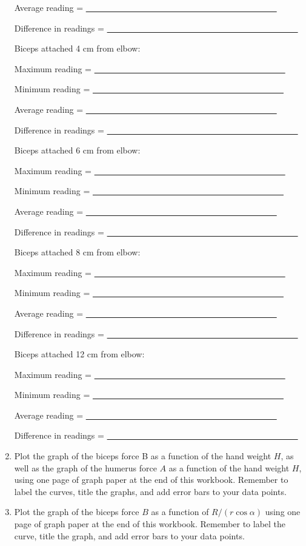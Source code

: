 \begin{enumerate}[label=\arabic*.]
Average reading = \ul{~~~~~~~~~~~~~~~~~~~~~~~~~~~~~~~~~~~~~~~~~~~~~}

Difference in readings = \ul{~~~~~~~~~~~~~~~~~~~~~~~~~~~~~~~~~~~~~~~~~~~~~}

Biceps attached 4 cm from elbow:

Maximum reading = \ul{~~~~~~~~~~~~~~~~~~~~~~~~~~~~~~~~~~~~~~~~~~~~~}

Minimum reading = \ul{~~~~~~~~~~~~~~~~~~~~~~~~~~~~~~~~~~~~~~~~~~~~~}

Average reading = \ul{~~~~~~~~~~~~~~~~~~~~~~~~~~~~~~~~~~~~~~~~~~~~~}

Difference in readings = \ul{~~~~~~~~~~~~~~~~~~~~~~~~~~~~~~~~~~~~~~~~~~~~~}

Biceps attached 6 cm from elbow:

Maximum reading = \ul{~~~~~~~~~~~~~~~~~~~~~~~~~~~~~~~~~~~~~~~~~~~~~}

Minimum reading = \ul{~~~~~~~~~~~~~~~~~~~~~~~~~~~~~~~~~~~~~~~~~~~~~}

Average reading = \ul{~~~~~~~~~~~~~~~~~~~~~~~~~~~~~~~~~~~~~~~~~~~~~}

Difference in readings = \ul{~~~~~~~~~~~~~~~~~~~~~~~~~~~~~~~~~~~~~~~~~~~~~}

Biceps attached 8 cm from elbow:

Maximum reading = \ul{~~~~~~~~~~~~~~~~~~~~~~~~~~~~~~~~~~~~~~~~~~~~~}

Minimum reading = \ul{~~~~~~~~~~~~~~~~~~~~~~~~~~~~~~~~~~~~~~~~~~~~~}

Average reading = \ul{~~~~~~~~~~~~~~~~~~~~~~~~~~~~~~~~~~~~~~~~~~~~~}

Difference in readings = \ul{~~~~~~~~~~~~~~~~~~~~~~~~~~~~~~~~~~~~~~~~~~~~~}

Biceps attached 12 cm from elbow:

Maximum reading = \ul{~~~~~~~~~~~~~~~~~~~~~~~~~~~~~~~~~~~~~~~~~~~~~}

Minimum reading = \ul{~~~~~~~~~~~~~~~~~~~~~~~~~~~~~~~~~~~~~~~~~~~~~}

Average reading = \ul{~~~~~~~~~~~~~~~~~~~~~~~~~~~~~~~~~~~~~~~~~~~~~}

Difference in readings = \ul{~~~~~~~~~~~~~~~~~~~~~~~~~~~~~~~~~~~~~~~~~~~~~}

\item Plot the graph of the biceps force B as a function of the hand weight \(H\), as well as the graph of the humerus force \(A\) as a function of the hand weight \(H\), using one page of graph paper at the end of this workbook.  Remember to label the curves, title the graphs, and add error bars to your data points.

\item Plot the graph of the biceps force \(B\) as a function of \(R/(r\cos\alpha)\) using one page of graph paper at the end of this workbook.  Remember to label the curve, title the graph, and add error bars to your data points.

\end{enumerate}


